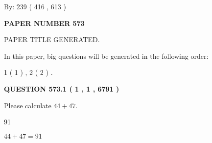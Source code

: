 \documentclass[12pt]{article}
\begin{document}
   
\hspace{1.0in} By: 
 239 ( 416 ,  613 )
   
   
   
   
\newpage 
\setcounter{page}{ 
   573001 } 
   
   
   
   
 {\textbf{ \Large{ PAPER NUMBER  573  }}}
   
   
\vspace{0.2in}
   
   
   
   
   
   
   
   
 \vspace{0.2in}
 
 
 
 
   
   
 PAPER TITLE GENERATED.
   
   
   
\vspace{0.2in}
   
In this paper, big questions will be generated in the following order: 
   
   
   1 ( 1 )
 ,
   2 ( 2 )
 .
  
\vspace{0.2in}
  
{\textbf{\Large{QUESTION
573.1 
 ( 1 , 1 , 6791 )
}}}
  
  
 
Please calculate $ %
44 +  %
47 $.
 
 
 
\noindent{}
 
 

91
 
 
\noindent{}
 
 

 
 
 
\noindent{}
 
 

$ %
44 +  %
47=   %
91$
 
 
\noindent{}
 
\end{document}
